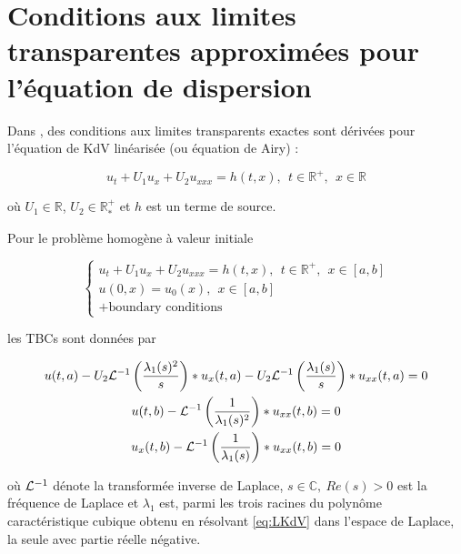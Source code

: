 \section{Conditions aux limites transparentes approximées pour l'équation de dispersion}

\indent Dans  \cite{besse2015}, des conditions aux limites transparents exactes sont dérivées pour l'équation de KdV linéarisée (ou équation de Airy) :

\begin{equation}
 	\label{eq:LKdV}
 	u_t + U_1u_x + U_2u_{xxx} = h(t,x), \ \ t \in \mathbb{R}^+, \ \ x \in \mathbb{R}
\end{equation}

\noindent où $U_1 \in \mathbb{R}$, $U_2 \in \mathbb{R}^+_*$ et $h$ est un terme de source.

\indent Pour le problème homogène à valeur initiale

\begin{equation*}
\begin{cases}
	u_t + U_1u_x + U_2u_{xxx} = h(t,x), \ \ t \in \mathbb{R}^+, \ \ x \in [a,b] \\
	u(0,x) = u_0(x), \ \ x \in [a,b] \\
	+ \text{boundary conditions} \nonumber
\end{cases}
\end{equation*}

\noindent les TBCs sont données \cite[équations 2.17,2.18]{besse2015} par 

\begin{equation}
\label{eq:continuousTBC}
\begin{gathered}
        u(t,a) - U_2 \mathcal{L}^{-1} \left( \frac{\lambda_1(s)^2}{s} \right) * u_x(t,a) - U_2 \mathcal{L}^{-1} \left( \frac{\lambda_1(s)}{s} \right) * u_{xx}(t,a) = 0 \\ 
        u(t,b) - \mathcal{L}^{-1} \left( \frac{1}{\lambda_1(s)^2} \right) * u_{xx}(t,b) = 0 \\
        u_x(t,b) - \mathcal{L}^{-1} \left( \frac{1}{\lambda_1(s)} \right) * u_{xx}(t,b) = 0 
\end{gathered}
\end{equation}

\noindent où $\mathcal{L}^{-1}$ dénote la transformée inverse de Laplace, $s \in \mathbb{C},\ Re(s)>0$ est la fréquence de Laplace et $\lambda_1$ est, parmi les trois racines du polynôme caractéristique cubique obtenu en résolvant \eqref{eq:LKdV} dans l'espace de Laplace, la seule avec partie réelle négative. \cite{zheng2008}

